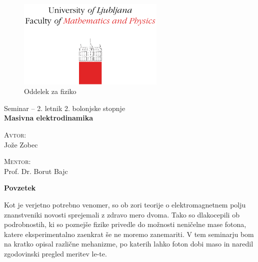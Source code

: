 \documentclass[a4paper, 12 pt, titlepage]{article}
\renewenvironment{abstract}[1][1.0]
{
	\begin{center}
		{\bf Povzetek}\\[12pt]
		\begin{minipage}{#1\textwidth}
}
{
		\end{minipage}
	\end{center}
}
\begin{document}
\begin{titlepage}
	\begin{figure}[H]
		\centering
		\includegraphics[width = 7cm, keepaspectratio=1]{pics/logo.pdf}\\[12pt]
		{\sc Oddelek za fiziko}\\[4cm]
	\end{figure}
	\begin{center}
		\large{Seminar -- 2. letnik 2. bolonjske stopnje}\\[0.5cm]
		\LARGE\textbf{Masivna elektrodinamika}\\[1.0cm]

		\vspace{0.0cm}

		\begin{minipage}{0.4\textwidth}\small
			\begin{flushleft}
				\textsc{Avtor:}\\[0.2cm]
				Jože Zobec
			\end{flushleft}
		\end{minipage}
		\begin{minipage}{0.4\textwidth}\small
			\begin{flushright}
				\textsc{Mentor:}\\[0.2cm]
				Prof. Dr. Borut Bajc
			\end{flushright}
		\end{minipage}
	\end{center}

	\vspace{4.5cm}

	\begin{abstract}
		Kot je verjetno potrebno venomer, so ob zori teorije o elektromagnetnem polju znanstveniki novosti
		sprejemali z zdravo mero dvoma. Tako so dlakocepili ob podrobnostih, ki so poznejše fizike privedle
		do možnosti neničelne mase fotona, katere eksperimentalno zaenkrat še ne moremo zanemariti. V tem
		seminarju bom na kratko opisal različne mehanizme, po katerih lahko foton dobi maso in naredil
		zgodovinski pregled meritev le-te.
	\end{abstract}
	
	\vfill

\end{titlepage}
\end{document}
